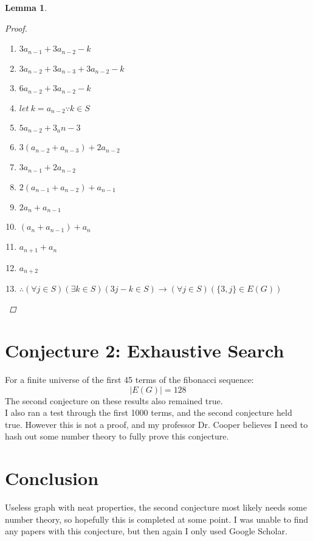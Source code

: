 \documentclass{article}
\newtheorem{lemma}[theorem]{Lemma}
\begin{document}
\begin{lemma}
\begin{proof}
\begin{enumerate}
        \item ${3a_{n-1}+3a_{n-2}-k}$
        \item ${3a_{n-2}+3a_{n-3}+3a_{n-2}-k}$
        \item ${6a_{n-2}+3a_{n-2}-k}$
        \item ${let\  k = a_{n-2}}\because k \in S$
        \item ${5a_{n-2}+3_a{n-3}}$
        \item ${3(a_{n-2}+a_{n-3})+2a_{n-2}}$
        \item ${3a_{n-1}+2a_{n-2}}$
        \item ${2(a_{n-1}+a_{n-2})+a_{n-1}}$
        \item ${2a_{n}+a_{n-1}}$
        \item ${(a_{n}+a_{n-1})+a_{n}}$
        \item ${a_{n+1} + a_{n}}$
        \item ${a_{n+2}}$
        \item $\therefore {(\forall j \in S)(\exists k \in S)(3j-k \in S)\rightarrow(\forall j\in S)(\{3,j\}\in E(G))}$
    \end{enumerate}
  \end{proof}
\end{lemma}

\section{Conjecture 2: Exhaustive Search}
For a finite universe of the first 45 terms of the fibonacci sequence:\\
\[|E(G)|=128\]
The second conjecture on these results also remained true.\\
I also ran a test through the first 1000 terms, and the second conjecture held true. However this is not a proof, and my professor Dr. Cooper believes I need to hash out some number theory to fully prove this conjecture.
\section{Conclusion}
Useless graph with neat properties, the second conjecture most likely needs some number theory, so hopefully this is completed at some point. I was unable to find any papers with this conjecture, but then again I only used Google Scholar.


\end{document}
